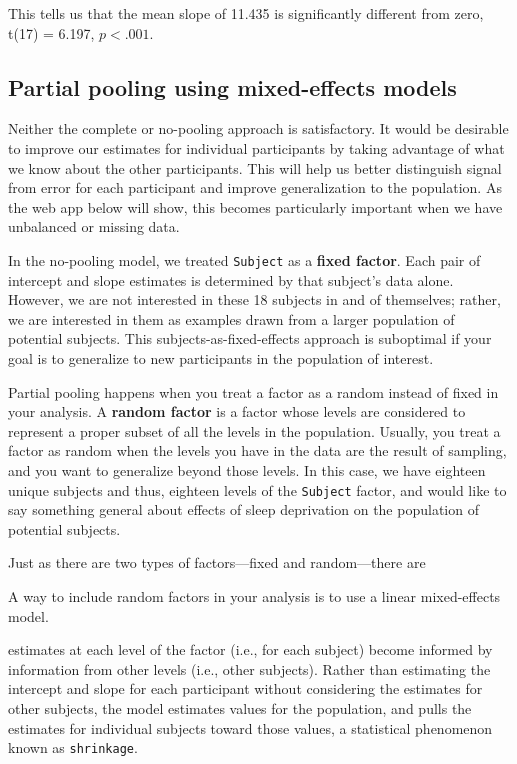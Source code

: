 \documentclass[]{book}
\begin{document}
This tells us that the mean slope of
11.435
is significantly different from zero,
t(17) = 6.197, \(p < .001\).

\hypertarget{partial-pooling-using-mixed-effects-models}{%
\subsection{Partial pooling using mixed-effects models}\label{partial-pooling-using-mixed-effects-models}}

Neither the complete or no-pooling approach is satisfactory. It would be desirable to improve our estimates for individual participants by taking advantage of what we know about the other participants. This will help us better distinguish signal from error for each participant and improve generalization to the population. As the web app below will show, this becomes particularly important when we have unbalanced or missing data.

In the no-pooling model, we treated \texttt{Subject} as a \textbf{fixed factor}. Each pair of intercept and slope estimates is determined by that subject's data alone. However, we are not interested in these 18 subjects in and of themselves; rather, we are interested in them as examples drawn from a larger population of potential subjects. This subjects-as-fixed-effects approach is suboptimal if your goal is to generalize to new participants in the population of interest.

Partial pooling happens when you treat a factor as a random instead of fixed in your analysis. A \textbf{random factor} is a factor whose levels are considered to represent a proper subset of all the levels in the population. Usually, you treat a factor as random when the levels you have in the data are the result of sampling, and you want to generalize beyond those levels. In this case, we have eighteen unique subjects and thus, eighteen levels of the \texttt{Subject} factor, and would like to say something general about effects of sleep deprivation on the population of potential subjects.

Just as there are two types of factors---fixed and random---there are

A way to include random factors in your analysis is to use a linear mixed-effects model.

estimates at each level of the factor (i.e., for each subject) become informed by information from other levels (i.e., other subjects). Rather than estimating the intercept and slope for each participant without considering the estimates for other subjects, the model estimates values for the population, and pulls the estimates for individual subjects toward those values, a statistical phenomenon known as \texttt{shrinkage}.
\end{document}

